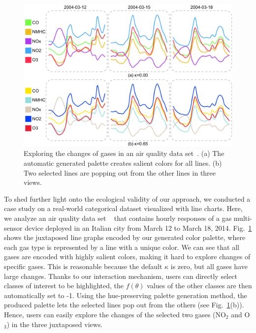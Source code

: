 \begin{figure}[!t]
\centering
\includegraphics[width=0.96\linewidth]{figures/case-linechart.pdf}
\caption{Exploring the changes of gases in an air quality data set~\cite{DEVITO2008750}. (a) The automatic generated palette creates salient colors for  all lines. (b) Two selected lines are popping out from the other lines in three views.}
\vspace*{-3mm}
\label{fig:caseStudy2}
\end{figure}

To shed further light onto the ecological validity of our approach, we conducted a case study on a real-world categorical dataset visualized with line charts.
Here, we analyze an air quality data set ~\cite{DEVITO2008750} that contains hourly responses of a gas multi-sensor device deployed in an Italian city from March 12 to March 18, 2014.
Fig.~\ref{fig:caseStudy2} shows the juxtaposed line graphs encoded by our generated color palette, where each gas type is represented by a line with a unique color.
We can see that all gases are encoded with highly salient colors, making it hard to explore changes of specific gases. This is reasonable because the default $\kappa$ is zero, but all gases have large changes.
Thanks to our interaction mechanism, users can directly select classes of interest to be highlighted,  the $f(\theta)$ values of the other classes are then automatically set to -1. Using the hue-preserving palette generation method, the produced palette lets the selected lines pop out from the others (see Fig.~\ref{fig:caseStudy2}(b)). Hence, users can easily explore the changes of the selected two gases (NO$_2$ and O$_3$) in the three juxtaposed views.


